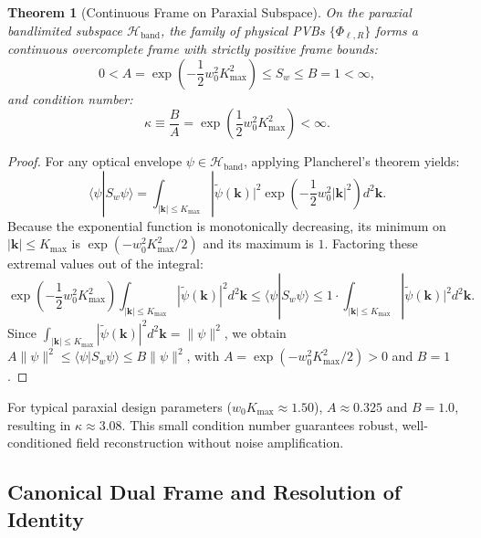 \documentclass{optica-article}
\newtheorem{theorem}{Theorem}
\begin{document}
\begin{theorem}[Continuous Frame on Paraxial Subspace]
On the paraxial bandlimited subspace $\mathcal{H}_{\text{band}}$, the family of physical PVBs $\{\Phi_{\ell, R}\}$ forms a continuous overcomplete frame with strictly positive frame bounds:
\begin{equation}
\boxed{0 < A = \exp\left(-\frac{1}{2} w_0^2 K_{\max}^2\right) \le S_w \le B = 1 < \infty,}
\end{equation}
and condition number:
\begin{equation}
\kappa \equiv \frac{B}{A} = \exp\left(\frac{1}{2} w_0^2 K_{\max}^2\right) < \infty.
\end{equation}
\end{theorem}

\begin{proof}
For any optical envelope $\psi \in \mathcal{H}_{\text{band}}$, applying Plancherel's theorem yields:
\begin{equation}
\langle \psi | S_w \psi \rangle = \int_{|\mathbf{k}| \le K_{\max}} |\widetilde{\psi}(\mathbf{k})|^2 \exp\left(-\frac{1}{2} w_0^2 |\mathbf{k}|^2\right) d^2\mathbf{k}.
\end{equation}
Because the exponential function is monotonically decreasing, its minimum on $|\mathbf{k}| \le K_{\max}$ is $\exp(-w_0^2 K_{\max}^2 / 2)$ and its maximum is $1$. Factoring these extremal values out of the integral:
\begin{equation}
\exp\left(-\frac{1}{2} w_0^2 K_{\max}^2\right) \int_{|\mathbf{k}| \le K_{\max}} |\widetilde{\psi}(\mathbf{k})|^2 d^2\mathbf{k} \le \langle \psi | S_w \psi \rangle \le 1 \cdot \int_{|\mathbf{k}| \le K_{\max}} |\widetilde{\psi}(\mathbf{k})|^2 d^2\mathbf{k}.
\end{equation}
Since $\int_{|\mathbf{k}| \le K_{\max}} |\widetilde{\psi}(\mathbf{k})|^2 d^2\mathbf{k} = \|\psi\|^2$, we obtain $A \|\psi\|^2 \le \langle \psi | S_w \psi \rangle \le B \|\psi\|^2$, with $A = \exp(-w_0^2 K_{\max}^2 / 2) > 0$ and $B = 1$.
\end{proof}

For typical paraxial design parameters ($w_0 K_{\max} \approx 1.50$), $A \approx 0.325$ and $B = 1.0$, resulting in $\kappa \approx 3.08$. This small condition number guarantees robust, well-conditioned field reconstruction without noise amplification.

\subsection{Canonical Dual Frame and Resolution of Identity}
\end{document}

